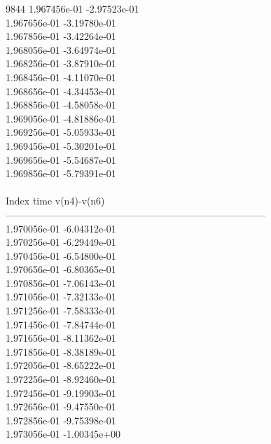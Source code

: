 9844	1.967456e-01	-2.97523e-01	\\ 	1.967656e-01	-3.19780e-01	\\ 	1.967856e-01	-3.42264e-01	\\ 	1.968056e-01	-3.64974e-01	\\ 	1.968256e-01	-3.87910e-01	\\ 	1.968456e-01	-4.11070e-01	\\ 	1.968656e-01	-4.34453e-01	\\ 	1.968856e-01	-4.58058e-01	\\ 	1.969056e-01	-4.81886e-01	\\ 	1.969256e-01	-5.05933e-01	\\ 	1.969456e-01	-5.30201e-01	\\ 	1.969656e-01	-5.54687e-01	\\ 	1.969856e-01	-5.79391e-01	\\ \hline
\\ \hline
Index   time            v(n4)-v(n6)     \\ \hline
--------------------------------------------------------------------------------\\ 	1.970056e-01	-6.04312e-01	\\ 	1.970256e-01	-6.29449e-01	\\ 	1.970456e-01	-6.54800e-01	\\ 	1.970656e-01	-6.80365e-01	\\ 	1.970856e-01	-7.06143e-01	\\ 	1.971056e-01	-7.32133e-01	\\ 	1.971256e-01	-7.58333e-01	\\ 	1.971456e-01	-7.84744e-01	\\ 	1.971656e-01	-8.11362e-01	\\ 	1.971856e-01	-8.38189e-01	\\ 	1.972056e-01	-8.65222e-01	\\ 	1.972256e-01	-8.92460e-01	\\ 	1.972456e-01	-9.19903e-01	\\ 	1.972656e-01	-9.47550e-01	\\ 	1.972856e-01	-9.75398e-01	\\ 	1.973056e-01	-1.00345e+00	\\ \hline
